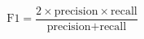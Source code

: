 \begin{equation}
    \label{F1}
    \text{F1} = \frac{2 \times \text{precision} \times \text{recall}}{\text{precision} + \text{recall}}
\end{equation}
